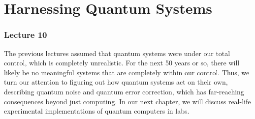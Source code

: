 \part{Harnessing Quantum Systems}

\section{Lecture 10}

The previous lectures assumed that quantum systems were under our total control,
which is completely unrealistic.
For the next 50 years or so, there will likely be no meaningful systems that are completely within our control. Thus,
we turn our attention to figuring out how quantum systems act on their own, describing quantum noise and quantum error correction,
which has far-reaching consequences beyond just computing.
In our next chapter, we will discuss real-life experimental implementations of quantum computers in labs.

